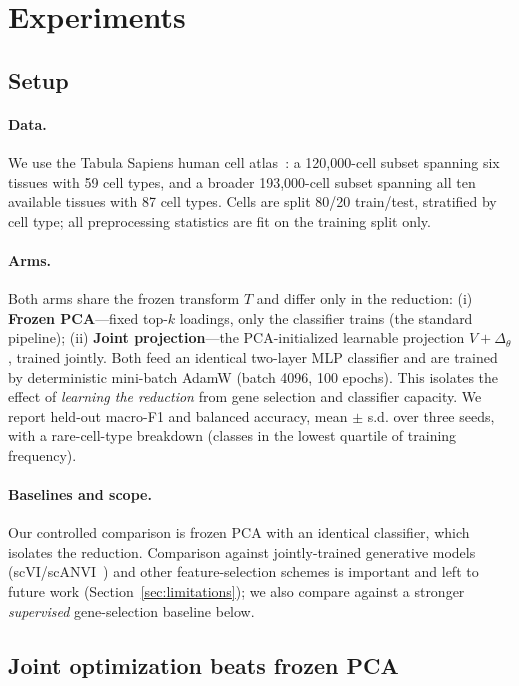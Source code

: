 \documentclass[10pt,twocolumn]{article}
\begin{document}
\section{Experiments}
\label{sec:experiments}

\subsection{Setup}
\label{sec:setup}

\paragraph{Data.} We use the Tabula Sapiens human cell
atlas~\citep{tabulasapiens2022}: a 120{,}000-cell subset spanning six tissues with 59
cell types, and a broader 193{,}000-cell subset spanning all ten available tissues with 87
cell types. Cells are split 80/20 train/test, stratified by cell type; all preprocessing
statistics are fit on the training split only.

\paragraph{Arms.} Both arms share the frozen transform $T$ and differ only in the
reduction: (i) \textbf{Frozen PCA}---fixed top-$k$ loadings, only the classifier trains
(the standard pipeline); (ii) \textbf{Joint projection}---the PCA-initialized learnable
projection $V+\Delta_\theta$, trained jointly. Both feed an identical two-layer MLP
classifier and are trained by deterministic mini-batch AdamW (batch 4096, 100 epochs).
This isolates the effect of \emph{learning the reduction} from gene selection and
classifier capacity. We report held-out macro-F1 and balanced accuracy, mean $\pm$ s.d.
over three seeds, with a rare-cell-type breakdown (classes in the lowest quartile of
training frequency).

\paragraph{Baselines and scope.} Our controlled comparison is frozen PCA with an identical
classifier, which isolates the reduction. Comparison against jointly-trained generative
models (scVI/scANVI~\citep{lopez2018scvi,xu2021scanvi}) and other feature-selection
schemes is important and left to future work (Section~\ref{sec:limitations}); we also
compare against a stronger \emph{supervised} gene-selection baseline below.

\subsection{Joint optimization beats frozen PCA}
\end{document}
